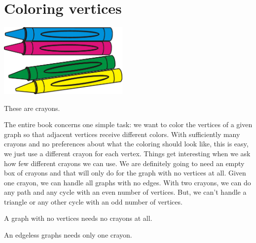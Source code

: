 \documentclass[openany]{tufte-book} %
\theoremstyle{plain}
\begin{document}
\chapter{Coloring vertices}
\begin{marginfigure}
		\includegraphics[width=2.5in]{pictures/crayons.png}
		\caption{These are crayons.}
\end{marginfigure}

The entire book concerns one simple task: we want to color the vertices of a given graph so that adjacent vertices receive different colors.
With sufficiently many crayons and no preferences about what the coloring should look like, this is easy, we just use a different crayon for each vertex.  
Things get interesting when we ask how few different crayons we can use.  We are definitely going to need an empty box of crayons and that will only do for the
graph with no vertices at all.  
Given one crayon, we can handle all graphs with no edges.  With two crayons, we can do
any path and any cycle with an even number of vertices.  But, we can't handle a triangle or any other cycle with an odd number of vertices.
\begin{marginfigure}
\caption{A graph with no vertices needs no crayons at all.}
\end{marginfigure}
\begin{marginfigure}[0.25in]
\centering
{}
\caption{An edgeless graphs needs only one crayon.}
\end{marginfigure}
\end{document}
